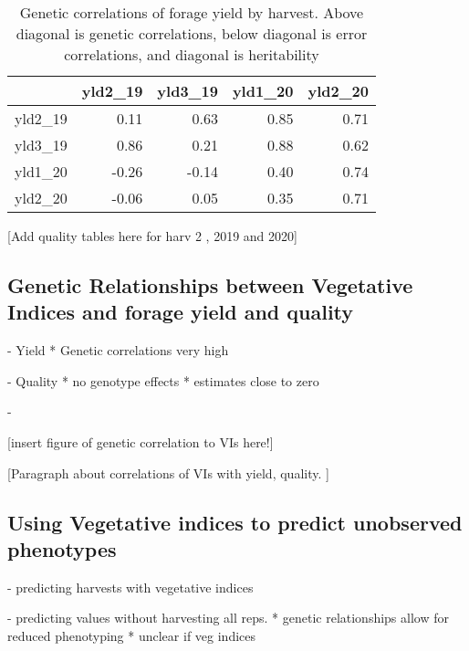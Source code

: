\documentclass[12pt, letterpaper]{article}
\begin{document}
\begin{table}[ht]
\caption{Genetic correlations of forage yield by harvest. Above diagonal is genetic correlations, below diagonal is error correlations, and diagonal is heritability}
\centering
\begin{tabular}{lrrrr}
  \hline
 & yld2\_19 & yld3\_19 & yld1\_20 & yld2\_20 \\ 
  \hline
yld2\_19 & 0.11 & 0.63 & 0.85 & 0.71 \\ 
  yld3\_19 & 0.86 & 0.21 & 0.88 & 0.62 \\ 
  yld1\_20 & -0.26 & -0.14 & 0.40 & 0.74 \\ 
  yld2\_20 & -0.06 & 0.05 & 0.35 & 0.71 \\ 
   \hline
\end{tabular}
\end{table}


[Add quality tables here for harv 2 , 2019 and 2020]

\subsection{Genetic Relationships between Vegetative Indices and forage yield and quality}	

- Yield
	* Genetic correlations very high

- Quality
	* no genotype effects
	* estimates close to zero

- 

[insert figure of genetic correlation to VIs here!]

[Paragraph about correlations of VIs with yield, quality. ]

 




\subsection{Using Vegetative indices to predict unobserved phenotypes}

- predicting harvests with vegetative indices

- predicting values without harvesting all reps. 
	* genetic relationships allow for reduced phenotyping
	* unclear if veg indices 
\end{document}

